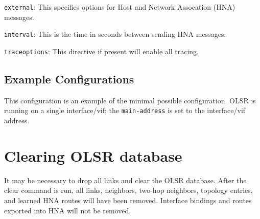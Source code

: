 \begin{description}
\item{\tt external}: This specifies options for Host and Network
  Assocation (HNA) messages.
\begin{description}
\item{\tt interval}: This is the time in seconds between sending
  HNA messages.
\end{description}

\item{\tt traceoptions}: This directive if present will enable all tracing.

\end{description}

\subsection{Example Configurations}

\vspace{0.1in}
\noindent{}

This configuration is an example of the minimal possible
configuration. OLSR is running on a single interface/vif;
the {\tt main-address} is set to the interface/vif address.

\newpage
\section{Clearing OLSR database}

It may be necessary to drop all links and clear the OLSR
database. After the clear command is run, all links, neighbors,
two-hop neighbors, topology entries, and learned HNA routes will have been
removed. Interface bindings and routes exported into HNA will not be removed.

